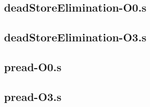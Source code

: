 \begin{appendices}
\subsection{deadStoreElimination-O0.s}

\subsection{deadStoreElimination-O3.s}


\subsection{pread-O0.s}

\subsection{pread-O3.s}

\label{app:compCertOutput}
\end{appendices}